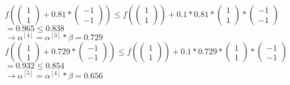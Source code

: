 \documentclass[a4paper, 11pt]{article}
\begin{document}
\begin{enumerate}
	$f( \left( \begin{array}{c} 1 \\ 1 \end{array} \right) + 0.81 * \left( \begin{array}{c} -1 \\ -1 \end{array} \right)) \leq f(\left( \begin{array}{c} 1 \\ 1 \end{array} \right)) + 0.1 * 0.81 *  \left( \begin{array}{c} 1 \\ 1 \end{array} \right) * \left( \begin{array}{c} -1 \\ -1 \end{array} \right)$ \\
	$= 0.965 \leq 0.838$ \\
	$\rightarrow \alpha^{[4]} = \alpha^{[3]} * \beta = 0.729$ \\
	
	$f( \left( \begin{array}{c} 1 \\ 1 \end{array} \right) + 0.729 * \left( \begin{array}{c} -1 \\ -1 \end{array} \right)) \leq f(\left( \begin{array}{c} 1 \\ 1 \end{array} \right)) + 0.1 * 0.729 *  \left( \begin{array}{c} 1 \\ 1 \end{array} \right) * \left( \begin{array}{c} -1 \\ -1 \end{array} \right)$ \\
	$= 0.932 \leq 0.854$ \\
	$\rightarrow \alpha^{[5]} = \alpha^{[4]} * \beta = 0.656$ \\
	

\end{enumerate}
\end{document}
